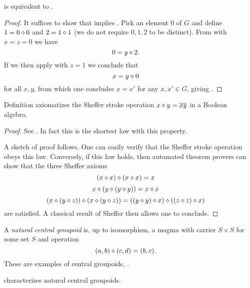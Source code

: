 \begin{theorem}[953 is equivalent to 2]\label{953_equiv_2}\leanok  {} is equivalent to .
\end{theorem}

\begin{proof}\leanok  It suffices to show that  implies .  Pick an element $0$ of $G$ and define $1 = 0 \diamond 0$ and $2 = 1 \diamond 1$ (we do not require $0,1,2$ to be distinct).
From  with $x=z=0$ we have
$$ 0 = y \diamond 2.$$
If we then apply  with $z=1$ we conclude that
$$ x = y \diamond 0$$
for all $x,y$, from which one concludes $x=x'$ for any $x,x' \in G$, giving .
\end{proof}


\begin{theorem}\label{sheffer}\leanok  Definition 
axiomatizes the Sheffer stroke operation $x \diamond y = \overline{xy}$ in a Boolean algebra.
\end{theorem}

\begin{proof}\leanok
See \cite{mccune_et_al}.  In fact this is the shortest law with this property.

A sketch of proof follows.  One can easily verify that the Sheffer stroke operation obeys this law.  Conversely, if this law holds, then automated theorem provers can show that the three Sheffer axioms
$$ (x \diamond x) \diamond (x \diamond x)  = x$$
$$ x \diamond (y \diamond (y \diamond y)) = x \diamond x$$
$$ (x \diamond (y \diamond z)) \diamond (x \diamond (y \diamond z)) = ((y \diamond y) \diamond x) \diamond ((z \diamond z) \diamond x)$$
are satisfied.  A classical result of Sheffer \cite{sheffer} then allows one to conclude.
\end{proof}

A \emph{natural central groupoid} is, up to isomorphism, a magma with carrier $S \times S$ for some set $S$ and operation
$$ (a,b) \diamond (c,d) = (b,c).$$
These are examples of central groupoids, .

\begin{theorem}\label{natural-central-groupoid}  characterizes natural central groupoids.
\end{theorem}

